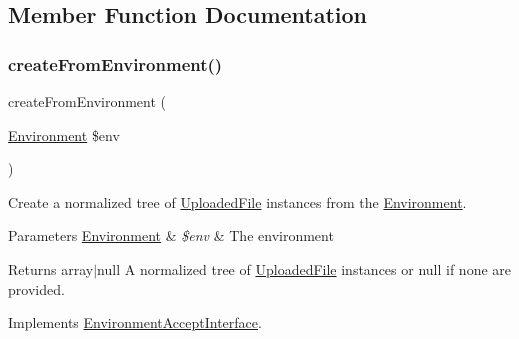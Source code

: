 \subsection{Member Function Documentation}
\mbox{\label{class_pes_1_1_http_1_1_factory_1_1_files_factory_af8ddc9154d8a4b8724714c21efcfa47d}} 
\subsubsection{\texorpdfstring{create\+From\+Environment()}{createFromEnvironment()}}
{\footnotesize\ttfamily create\+From\+Environment (\begin{DoxyParamCaption}\item[{\mbox{\hyperlink{class_pes_1_1_http_1_1_environment}{Environment}}}]{\$env }\end{DoxyParamCaption})}

Create a normalized tree of \mbox{\hyperlink{class_pes_1_1_http_1_1_uploaded_file}{Uploaded\+File}} instances from the \mbox{\hyperlink{class_pes_1_1_http_1_1_environment}{Environment}}.


\begin{DoxyParams}[1]{Parameters}
\mbox{\hyperlink{class_pes_1_1_http_1_1_environment}{Environment}} & {\em \$env} & The environment\\
\hline
\end{DoxyParams}
\begin{DoxyReturn}{Returns}
array$\vert$null A normalized tree of \mbox{\hyperlink{class_pes_1_1_http_1_1_uploaded_file}{Uploaded\+File}} instances or null if none are provided. 
\end{DoxyReturn}


Implements \mbox{\hyperlink{interface_pes_1_1_http_1_1_factory_1_1_environment_accept_interface}{Environment\+Accept\+Interface}}.

\mbox{\label{class_pes_1_1_http_1_1_factory_1_1_files_factory_a381f2024f052049eb0b77ee47199861b}} 
